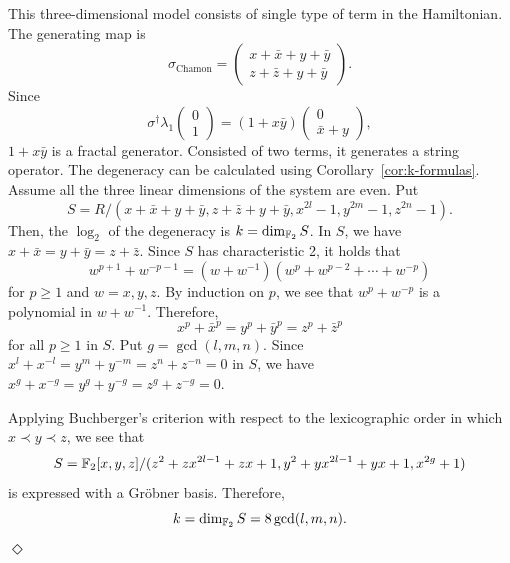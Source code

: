 \begin{example}
This three-dimensional model consists of single type of term in the Hamiltonian.
The generating map is
\[
\sigma_\text{Chamon} =
\begin{pmatrix}
 x+\bar x + y + \bar y \\
\hline
 z+\bar z + y + \bar y
\end{pmatrix}.
\]
Since
\[
 \sigma^\dagger \lambda_1
\begin{pmatrix}
0 \\ 
1
\end{pmatrix}
=
(1+ x \bar y)
\begin{pmatrix}
 0 \\
\bar x + y
\end{pmatrix},
\]
$1+x \bar y$ is a fractal generator.
Consisted of two terms, it generates a string operator.
The degeneracy can be calculated using Corollary~\ref{cor:k-formulas}.
Assume all the three linear dimensions of the system are even.
Put
\[
 S = R / (x + \bar x + y + \bar y, z + \bar z + y + \bar y, x^{2l} -1, y^{2m}-1, z^{2n} -1 ).
\]
Then, the $\log_2$ of the degeneracy is $k = \dim_{\mathbb{F}_2} S$.
In $S$, we have $x + \bar x = y + \bar y = z + \bar z$.
Since $S$ has characteristic 2, it holds that
\[
 w^{p+1} + w^{-p-1} = (w + w^{-1})(w^p + w^{p-2} + \cdots + w^{-p})
\]
for $p \ge 1$ and $w = x,y,z$. By induction on $p$, we see that $w^{p} + w^{-p}$
is a polynomial in $w + w^{-1}$. Therefore,
\[
 x^p + \bar x ^p = y^p + \bar y^p = z^p + \bar z^p
\]
for all $p \ge 1$ in $S$.
Put $g = \gcd(l,m,n)$.
Since $x^l + x^{-l} = y^m + y^{-m} = z^n + z^{-n} = 0$ in $S$,
we have $x^g + x^{-g} = y^g + y^{-g} = z^g + z^{-g} = 0$.

Applying Buchberger's criterion with respect to the lexicographic order in which $x \prec y \prec z$,
we see that
\[
 S = \mathbb{F}_2[x,y,z] / (z^2 + zx^{2l-1}+ zx+1, y^2 + yx^{2l-1}+yx+1, x^{2g}+1)
\]
is expressed with a Gr\"obner basis. Therefore,
\[
 k = \dim_{\mathbb{F}_2} S = 8 \gcd(l,m,n).
\]
\hfill $\Diamond$
\label{eg:ChamonModel}
\end{example}

